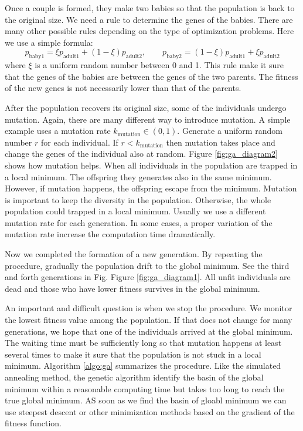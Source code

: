 Once a couple is formed, they make two babies so that the population is back to the original size.  We need a rule to determine the genes of the babies. There are many other possible rules depending on the type of optimization problems.
Here we use a simple formula:
\begin{equation}
p_\text{baby1} = \xi p_\text{adult1} + (1-\xi ) p_\text{adult2}, \qquad p_\text{baby2} = (1-\xi) p_\text{adult1} + \xi p_\text{adult2}
\end{equation}
where $\xi$ is a uniform random number between 0 and 1.  This rule make it sure that the genes of the babies are between the genes of the two parents.  The fitness of the new genes is not necessarily lower than that of the parents.

After the population recovers its original size, some of the individuals undergo mutation. Again, there are many different way to introduce mutation.  A simple example uses a mutation rate $k_\text{mutation} \in (0,1)$.  Generate a uniform random number $r$ for each individual.  If $r<k_\text{mutation}$ then mutation takes place and change the genes of the individual also at random. 
Figure \ref{fig:ga_diagram2} shows how mutation helps. When all individuals in the population are trapped in a local minimum.  The offspring they generates also in the same minimum.  However, if mutation happens, the offspring escape from the minimum. Mutation is important to keep the diversity in the population. Otherwise, the whole population could trapped in a local minimum. 
Usually we use a different mutation rate for each generation. In some cases, a proper variation of the mutation rate increase the computation time dramatically.

Now we completed the formation of a new generation.  By repeating the procedure, gradually the population drift to the global minimum. See the third and forth generations in Fig. Figure \ref{fig:ga_diagram1}.  All unfit individuals are dead and those who have lower fitness survives in the global minimum.



An important and difficult question is when we stop the procedure.  We monitor the lowest fitness value among the population.  If that does not change for many generations, we hope that one of the individuals arrived at the global minimum.  The waiting time must be sufficiently long so that mutation happens at least several times to make it sure that the population is not stuck in a local minimum.
Algorithm \ref{algo:ga} summarizes the procedure. Like the simulated annealing method, the genetic algorithm identify the basin of the global minimum within a reasonable computing time but takes too long to reach the true global minimum. AS soon as we find the basin of gloabl minimum we can use steepest descent or other minimization methods based on the gradient of the fitness function. 


